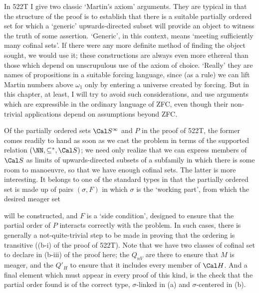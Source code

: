 {In 522T I give two classic `Martin's axiom' arguments.   They are
typical in that the structure of the proof is to establish that there is
a suitable
partially ordered set for which a `generic' upwards-directed subset will
provide an object to witness the truth of some assertion.   `Generic',
in this context, means `meeting sufficiently many cofinal sets'.   If
there were any more definite method of finding the object sought, we
would use it;  these constructions are always even more ethereal than
those which depend on unscrupulous use of the axiom of choice.
`Really' they are names of propositions in a suitable forcing language,
since (as a
rule) we can lift Martin numbers above $\omega_1$ only by entering a
universe created by forcing.   But in this chapter, at least, I will
try to avoid such considerations, and use arguments which are
expressible in the ordinary language of ZFC, even though their
non-trivial applications depend on assumptions beyond ZFC.

Of the partially ordered sets $\Cal S^{\infty}$ and $P$ in the proof of
522T, the former comes readily to hand as soon as we cast the problem in
terms of the supported relation $(\NN,\subseteq^*,\Cal S)$;  we need
only realize that we can express members of $\Cal S$ as limits of
upwards-directed subsets of a subfamily in which there is some room to
manoeuvre, so that we have enough cofinal sets.   The latter is more
interesting.   It belongs to one of the standard types in that the
partially ordered set is made up of pairs $(\sigma,F)$ in which $\sigma$
is the `working part', from which the desired meager set


\noindent will be constructed, and $F$ is a `side condition', designed
to ensure that the partial order of $P$ interacts correctly with the
problem.   In such cases, there is generally a not-quite-trivial step to
be made in proving that the ordering is transitive ((b-i) of the proof
of 522T).   Note that we have two classes of cofinal set to declare in
(b-iii) of the proof here;  the $Q_{nV}$ are there to ensure that $M$ is
meager, and the $Q'_H$ to ensure that it includes every member of
$\Cal H$.   And a final element which must appear in every proof of this
kind, is the check that the partial order found is of the correct
type, $\sigma$-linked in (a) and $\sigma$-centered in (b).

}
